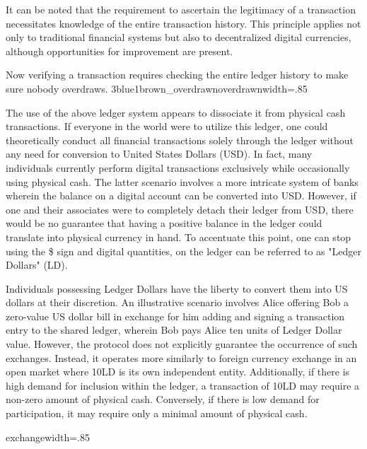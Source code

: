 It can be noted that the requirement to ascertain the legitimacy of a transaction necessitates knowledge of the entire transaction history.
This principle applies not only to traditional financial systems but also to decentralized digital currencies, although opportunities for
improvement are present.

{Now verifying a transaction requires checking the entire ledger history to make sure nobody overdraws.}
{3blue1brown_overdrawn}{overdrawn}{width=.85\textwidth}%

The use of the above ledger system appears to dissociate it from physical cash transactions. If everyone in the world were to utilize this
ledger, one could theoretically conduct all financial transactions solely through the ledger without any need for conversion to United States
Dollars (USD). In fact, many individuals currently perform digital transactions exclusively while occasionally using physical cash. The
latter scenario involves a more intricate system of banks wherein the balance on a digital account can be converted into USD. However, if
one and their associates were to completely detach their ledger from USD, there would be no guarantee that having a positive balance in the
ledger could translate into physical currency in hand. To accentuate this point, one can stop using the \$ sign and digital quantities, on
the ledger can be referred to as "Ledger Dollars" (LD).

Individuals possessing Ledger Dollars have the liberty to convert them into US dollars at their discretion. An illustrative scenario involves
Alice offering Bob a zero-value US dollar bill in exchange for him adding and signing a transaction entry to the shared ledger, wherein Bob
pays Alice ten units of Ledger Dollar value. However, the protocol does not explicitly guarantee the occurrence of such exchanges. Instead,
it operates more similarly to foreign currency exchange in an open market where 10LD is its own independent entity. Additionally, if there
is high demand for inclusion within the ledger, a transaction of 10LD may require a non-zero amount of physical cash. Conversely, if there
is low demand for participation, it may require only a minimal amount of physical cash.

{exchange}{width=.85\textwidth}%

